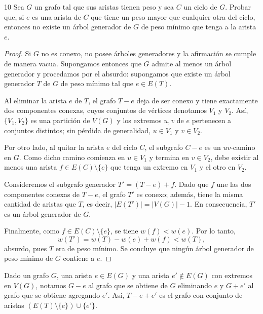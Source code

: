 \begin{ejercicioEntregar}{10}
    Sea \( G \) un grafo tal que sus aristas tienen peso y sea \( C \) un ciclo de \( G \). Probar que, si \( e \) es una arista de \( C \) que tiene un peso mayor que cualquier otra del ciclo, entonces no existe un árbol generador de \( G \) de peso mínimo que tenga a la arista \( e \).
\end{ejercicioEntregar}
\begin{proof}
    Si \( G \) no es conexo, no posee árboles generadores y la afirmación se cumple de manera vacua. Supongamos entonces que \( G \) admite al menos un árbol generador y procedamos por el absurdo: supongamos que existe un árbol generador \( T \) de \( G \) de peso mínimo tal que \( e \in E(T) \).

    Al eliminar la arista \( e \) de \( T \), el grafo \( T - e \) deja de ser conexo y tiene exactamente dos componentes conexas, cuyos conjuntos de vértices denotamos \( V_1 \) y \( V_2 \). Así, \( \{V_1, V_2\} \) es una partición de \( V(G) \) y los extremos \( u, v \) de \( e \) pertenecen a conjuntos distintos; sin pérdida de generalidad, \( u \in V_1 \) y \( v \in V_2 \).

    Por otro lado, al quitar la arista \( e \) del ciclo \( C \), el subgrafo \( C - e \) es un \( uv \)-camino en \( G \). Como dicho camino comienza en \( u \in V_1 \) y termina en \( v \in V_2 \), debe existir al menos una arista \( f \in E(C) \setminus \{e\} \) que tenga un extremo en \( V_1 \) y el otro en \( V_2 \).

    Consideremos el subgrafo generador \( T' = (T - e) + f \). Dado que \( f \) une las dos componentes conexas de \( T - e \), el grafo \( T' \) es conexo; además, tiene la misma cantidad de aristas que \( T \), es decir, \( |E(T')| = |V(G)| - 1 \). En consecuencia, \( T' \) es un árbol generador de \( G \).

    Finalmente, como \( f \in E(C) \setminus \{e\} \), se tiene \( w(f) < w(e) \). Por lo tanto,
    \[
        w(T') = w(T) - w(e) + w(f) < w(T),
    \]
    absurdo, pues \( T \) era de peso mínimo. Se concluye que ningún árbol generador de peso mínimo de \( G \) contiene a \( e \).
\end{proof}

\vspace{0.5cm}

\begin{definition}
    Dado un grafo \( G \), una arista \( e \in E(G) \) y una arista \( e' \notin E(G) \) con extremos en \( V(G) \), notamos \( G - e \) al grafo que se obtiene de \( G \) eliminando \( e \) y \( G + e' \) al grafo que se obtiene agregando \( e' \). Así, \( T - e + e' \) es el grafo con conjunto de aristas \( \left( E(T) \setminus \{e\} \right) \cup \{e'\} \).
\end{definition}

